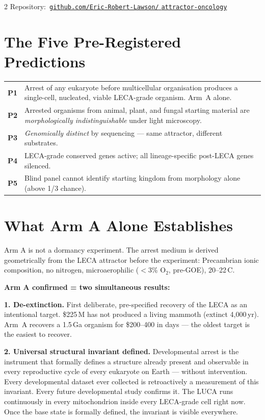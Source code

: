 \documentclass[9.5pt, a4paper]{article}
\begin{document}
\begin{multicols}{2}
{\smallskip
Repository:\
\href{https://github.com/Eric-Robert-Lawson/attractor-oncology}
{\texttt{github.com/Eric-Robert-Lawson/}
\texttt{attractor-oncology}}
}

\section{The Five Pre-Registered Predictions}

{\small
\begin{tabular}{p{0.35cm}p{5.7cm}}
\textbf{P1} &
Arrest of any eukaryote before multicellular
organisation produces a single-cell, nucleated,
viable LECA-grade organism. Arm~A alone. \\[0.15em]
\textbf{P2} &
Arrested organisms from animal, plant, and fungal
starting material are \textit{morphologically
indistinguishable} under light microscopy. \\[0.15em]
\textbf{P3} &
\textit{Genomically distinct} by sequencing ---
same attractor, different substrates. \\[0.15em]
\textbf{P4} &
LECA-grade conserved genes active; all
lineage-specific post-LECA genes silenced. \\[0.15em]
\textbf{P5} &
Blind panel cannot identify starting kingdom
from morphology alone (above 1/3 chance). \\
\end{tabular}
}

\columnbreak


\section{What Arm A Alone Establishes}

{\small
Arm A is not a dormancy experiment.
The arrest medium is derived geometrically
from the LECA attractor before the experiment:
Precambrian ionic composition, no nitrogen,
microaerophilic ($<$3\% O$_2$, pre-GOE),
20--22\,\textdegree C.

\textbf{Arm A confirmed = two simultaneous results:}

\textbf{1. De-extinction.}
First deliberate, pre-specified recovery of the
LECA as an intentional target.
\$225\,M has not produced a living mammoth
(extinct 4,000\,yr). Arm~A recovers a 1.5\,Ga
organism for \$200--400 in days --- the oldest
target is the easiest to recover.

\textbf{2. Universal structural invariant defined.}
Developmental arrest is the instrument that
formally defines a structure already present
and observable in every reproductive cycle
of every eukaryote on Earth --- without
intervention. Every developmental dataset
ever collected is retroactively a measurement
of this invariant. Every future developmental
study confirms it. The LUCA runs continuously
in every mitochondrion inside every LECA-grade
cell right now. Once the base state is formally
defined, the invariant is visible everywhere.
}


\end{multicols}
\end{document}
